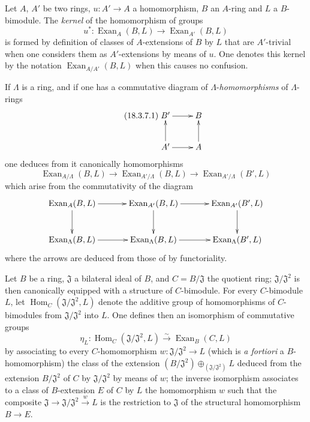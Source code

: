 \begin{env}[18.3.7]
\label{0.18.3.7}
Let $A$, $A'$ be two rings, $u:A'\to A$ a homomorphism, $B$ an $A$-ring and $L$ a $B$-bimodule.
The \emph{kernel} of the homomorphism of groups
\[
  u^*:\operatorname{Exan}_A(B,L)\to\operatorname{Exan}_{A'}(B,L)
\]
is formed by definition of classes of $A$-extensions of $B$ by $L$ that are $A'$-trivial when one considers them as $A'$-extensions by means of $u$.
One denotes this kernel by the notation $\operatorname{Exan}_{A/A'}(B,L)$ when this causes no confusion.

If $\Lambda$ is a ring, and if one has a commutative diagram of $\Lambda$-\emph{homomorphisms} of $\Lambda$-rings
\begin{equation}
\tag{18.3.7.1}
  \label{0.18.3.7.1}
  \xymatrix{
    B'\ar[r] & B\\
    A'\ar[u]\ar[r] & A\ar[u]
  }
\end{equation}
one deduces from it canonically homomorphisms
\begin{equation}
\tag{18.3.7.2}
  \label{0.18.3.7.2}
  \operatorname{Exan}_{A/\Lambda}(B,L)\to\operatorname{Exan}_{A'/\Lambda}(B,L)\to\operatorname{Exan}_{A'/\Lambda}(B',L)
\end{equation}
which arise from the commutativity of the diagram
\[
  \xymatrix@C=2.8pc@R=2.3pc{
    \operatorname{Exan}_A(B,L)\ar[r]\ar[d]
      & \operatorname{Exan}_{A'}(B,L)\ar[r]\ar[d]
      & \operatorname{Exan}_{A'}(B',L)\ar[d]\\
    \operatorname{Exan}_{\Lambda}(B,L)\ar[r]
      & \operatorname{Exan}_{\Lambda}(B,L)\ar[r]
      & \operatorname{Exan}_{\Lambda}(B',L)
  }
\]
where the arrows are deduced from those of  by functoriality.
\end{env}

\begin{proposition}[18.3.8]
\label{0.18.3.8}
Let $B$ be a ring, $\mathfrak{J}$ a bilateral ideal of $B$, and $C=B/\mathfrak{J}$ the quotient ring; $\mathfrak{J}/\mathfrak{J}^2$ is then canonically equipped with a structure of $C$-bimodule.
For every $C$-bimodule $L$, let $\operatorname{Hom}_C(\mathfrak{J}/\mathfrak{J}^2,L)$ denote the additive group of homomorphisms of $C$-bimodules from $\mathfrak{J}/\mathfrak{J}^2$ into $L$.
One defines then an isomorphism of commutative groups
\begin{equation}
\tag{18.3.8.1}
  \label{0.18.3.8.1}
  \eta_L:\operatorname{Hom}_C(\mathfrak{J}/\mathfrak{J}^2,L)\xrightarrow{\sim}\operatorname{Exan}_B(C,L)
\end{equation}
by associating to every $C$-homomorphism $w:\mathfrak{J}/\mathfrak{J}^2\to L$ (which is \emph{a fortiori} a $B$-homomorphism) the class of the extension $(B/\mathfrak{J}^2)\oplus_{(\mathfrak{J}/\mathfrak{J}^2)} L$ deduced from the extension $B/\mathfrak{J}^2$ of $C$ by $\mathfrak{J}/\mathfrak{J}^2$ by means of $w$; the inverse isomorphism associates to a class of $B$-extension $E$ of $C$ by $L$ the homomorphism $w$ such that the composite $\mathfrak{J}\to\mathfrak{J}/\mathfrak{J}^2\xrightarrow{w} L$ is the restriction to $\mathfrak{J}$ of the structural homomorphism $B\to E$.
\end{proposition}

